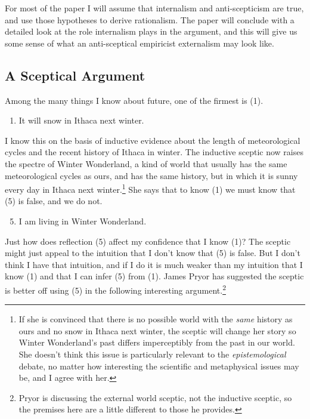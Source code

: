 For most of the paper I will assume that internalism and anti-scepticism
are true, and use those hypotheses to derive rationalism. The paper will
conclude with a detailed look at the role internalism plays in the
argument, and this will give us some sense of what an anti-sceptical
empiricist externalism may look like.

\hypertarget{a-sceptical-argument}{%
\subsection{A Sceptical Argument}\label{a-sceptical-argument}}

Among the many things I know about future, one of the firmest is (1).

\begin{enumerate}
\item
  It will snow in Ithaca next winter.
\end{enumerate}

I know this on the basis of inductive evidence about the length of
meteorological cycles and the recent history of Ithaca in winter. The
inductive sceptic now raises the spectre of Winter Wonderland, a kind of
world that usually has the same meteorological cycles as ours, and has
the same history, but in which it is sunny every day in Ithaca next
winter.\footnote{If she is convinced that there is no possible world
  with the \emph{same} history as ours and no snow in Ithaca next
  winter, the sceptic will change her story so Winter Wonderland's past
  differs imperceptibly from the past in our world. She doesn't think
  this issue is particularly relevant to the \emph{epistemological}
  debate, no matter how interesting the scientific and metaphysical
  issues may be, and I agree with her.} She says that to know (1) we
must know that (5) is false, and we do not.

\begin{enumerate}
\setcounter{enumi}{4}
\item
  I am living in Winter Wonderland.
\end{enumerate}

Just how does reflection (5) affect my confidence that I know (1)? The
sceptic might just appeal to the intuition that I don't know that (5) is
false. But I don't think I have that intuition, and if I do it is much
weaker than my intuition that I know (1) and that I can infer (5) from
(1). James Pryor \citeyearpar[527-529]{Pryor2000} has suggested the
sceptic is better off using (5) in the following interesting
argument.\footnote{Pryor is discussing the external world sceptic, not
  the inductive sceptic, so the premises here are a little different to
  those he provides.}

